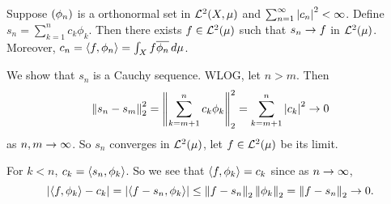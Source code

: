   Suppose \(\left( \phi_n \right)\) is a orthonormal set in \(\mathcal{L}^{2}(X, \mu)\) and \(\sum_{n=1}^{\infty} \left| c_n \right|^2 < \infty\). Define \(s_n = \sum_{k=1}^{n} c_k\phi_k\). Then there exists \(f \in \mathcal{L}^{2}(\mu)\) such that \(s_n \rightarrow f\) in \(\mathcal{L}^{2}(\mu)\). Moreover, \(c_n = \left\langle f, \phi_n \right\rangle = \int_X f \overline{\phi_n} \,d{\mu}\).

\pf We show that \(s_n\) is a Cauchy sequence. WLOG, let \(n > m\). Then
\[
    \left\lVert s_n - s_m \right\rVert_2^2 = \left\lVert \sum_{k=m+1}^{n} c_k \phi_k \right\rVert_2^2 = \sum_{k=m+1}^{n} \left| c_k \right|^2 \rightarrow 0
\]
as \(n, m \rightarrow \infty\). So \(s_n\) converges in \(\mathcal{L}^{2}(\mu)\), let \(f \in \mathcal{L}^{2}(\mu)\) be its limit.

For \(k < n\), \(c_k = \left\langle s_n, \phi_k \right\rangle\). So we see that \(\left\langle f, \phi_k \right\rangle = c_k\) since as \(n \rightarrow \infty\),
\[
    \left| \left\langle f, \phi_k \right\rangle - c_k \right| = \left| \left\langle f - s_n, \phi_k \right\rangle \right| \leq \left\lVert f - s_n \right\rVert_2 \left\lVert \phi_k \right\rVert_2 = \left\lVert f - s_n \right\rVert_2 \rightarrow 0.
\]

\pagebreak
